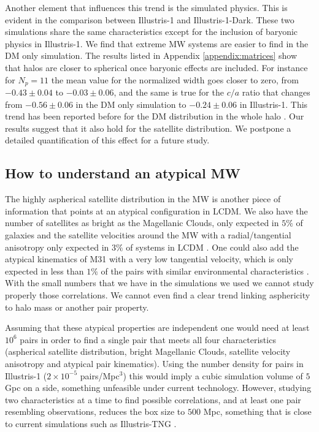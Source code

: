 \documentclass[a4paper,fleqn,usenatbib]{mnras}
\begin{document}
Another element that influences this trend is the simulated physics.
This is evident in the comparison between Illustris-1 and Illustris-1-Dark.
These two simulations share the same characteristics except for the
inclusion of baryonic physics in Illustris-1.
We find that extreme MW systems are easier to find in the DM only
simulation. 
The results listed in Appendix \ref{appendix:matrices} show that
halos are closer to spherical once baryonic effects are included. 
For instance for $N_p=11$ the mean value for the normalized width goes
closer to zero, from $-0.43\pm 0.04$  to $-0.03\pm0.06$, and the same
is true for the $c/a$ ratio that changes from $-0.56\pm0.06$ in the DM
only simulation to $-0.24\pm 0.06$ in Illustris-1.  
This trend has been reported before for the DM distribution in the
whole halo \cite{2013MNRAS.429.3316B}.
Our results suggest that it also hold for the satellite distribution.
We postpone a detailed quantification of this effect for a future
study.  


\subsection{How to understand an atypical MW}

The highly aspherical satellite distribution in the MW is another piece of
information that points at an atypical configuration in LCDM.
We also have the number of satellites as bright as the Magellanic
Clouds, only expected in $5\%$ of galaxies
\citep{2011ApJ...743..117B} and 
the satellite velocities around the MW with a radial/tangential
anisotropy only expected in $3\%$ of systems in LCDM
\citep{2017MNRAS.468L..41C}. 
One could also add the atypical kinematics of M31 with a very low
tangential velocity, which is only expected in less than $1\%$ of the pairs
with similar environmental characteristics \citep{ForeroRomero2013}.  
With the small numbers that we have in the simulations we used we
cannot study properly those correlations. 
We cannot even find a clear trend linking asphericity to halo mass or
another pair property.

Assuming that these atypical properties are independent one would need at
least $10^6$ pairs in order to find a single pair that meets all four
characteristics (aspherical satellite distribution, bright Magellanic
Clouds, satellite velocity anisotropy and atypical pair kinematics).
Using the number density for pairs in Illustris-1 ($2\times 10^{-5}$
pairs/Mpc$^{3}$) this would imply a cubic simulation volume of $5$ Gpc on a
side, something unfeasible under current technology.
However, studying two characteristics at a time to find possible
correlations, and at least one pair resembling observations, reduces
the box size to $500$ Mpc, something that is close to current
simulations such as Illustris-TNG \citep{2018MNRAS.473.4077P}. 
\end{document}
